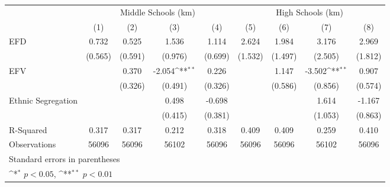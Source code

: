{
\def\sym#1{\ifmmode^{#1}\else\(^{#1}\)\fi}
\begin{tabular}{l*{8}{c}}
\toprule
                    &\multicolumn{4}{c}{Middle Schools (km)}                                            &\multicolumn{4}{c}{High Schools (km)}                                              \\\cmidrule(lr){2-5}\cmidrule(lr){6-9}
                    &\multicolumn{1}{c}{(1)}        &\multicolumn{1}{c}{(2)}        &\multicolumn{1}{c}{(3)}        &\multicolumn{1}{c}{(4)}        &\multicolumn{1}{c}{(5)}        &\multicolumn{1}{c}{(6)}        &\multicolumn{1}{c}{(7)}        &\multicolumn{1}{c}{(8)}        \\
\midrule
EFD                 &       0.732        &       0.525        &       1.536        &       1.114        &       2.624        &       1.984        &       3.176        &       2.969        \\
                    &     (0.565)        &     (0.591)        &     (0.976)        &     (0.699)        &     (1.532)        &     (1.497)        &     (2.505)        &     (1.812)        \\
EFV                 &                    &       0.370        &      -2.054\sym{**}&       0.226        &                    &       1.147        &      -3.502\sym{**}&       0.907        \\
                    &                    &     (0.326)        &     (0.491)        &     (0.326)        &                    &     (0.586)        &     (0.856)        &     (0.574)        \\
Ethnic Segregation  &                    &                    &       0.498        &      -0.698        &                    &                    &       1.614        &      -1.167        \\
                    &                    &                    &     (0.415)        &     (0.381)        &                    &                    &     (1.053)        &     (0.863)        \\
\midrule
R-Squared           &\multicolumn{1}{c}{0.317}        &\multicolumn{1}{c}{0.317}        &\multicolumn{1}{c}{0.212}        &\multicolumn{1}{c}{0.318}        &\multicolumn{1}{c}{0.409}        &\multicolumn{1}{c}{0.409}        &\multicolumn{1}{c}{0.259}        &\multicolumn{1}{c}{0.410}        \\
Observations        &\multicolumn{1}{c}{56096}        &\multicolumn{1}{c}{56096}        &\multicolumn{1}{c}{56102}        &\multicolumn{1}{c}{56096}        &\multicolumn{1}{c}{56096}        &\multicolumn{1}{c}{56096}        &\multicolumn{1}{c}{56102}        &\multicolumn{1}{c}{56096}        \\
\bottomrule
\multicolumn{9}{l}{\footnotesize Standard errors in parentheses}\\
\multicolumn{9}{l}{\footnotesize \sym{*} \(p<0.05\), \sym{**} \(p<0.01\)}\\
\end{tabular}
}
